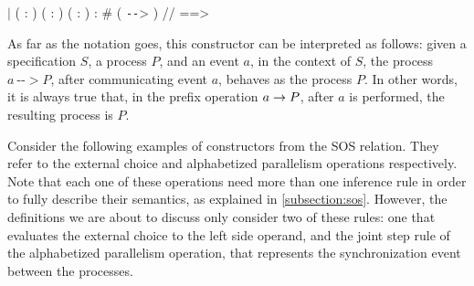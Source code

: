 \begin{coqdoccode}
	\coqdocnoindent
	\ensuremath{|}  ( : ) ( : ) ( : ) :\coqdoceol
	\coqdocindent{1.00em}
	 \# ( \texttt{-{}-}> ) //   ==> \coqdoceol
\end{coqdoccode}

As far as the notation goes, this constructor can be interpreted as follows: given a specification $ S $, a process $ P $, and an event $ a $, in the context of $ S $, the process $ a \ \texttt{-{}-}> P $, after communicating event $ a $, behaves as the process $ P $. In other words, it is always true that, in the prefix operation $ a \mathrel{\rightarrow} P $, after $ a $ is performed, the resulting process is $ P $.

Consider the following examples of constructors from the SOS relation. They refer to the external choice and alphabetized parallelism operations respectively. Note that each one of these operations need more than one inference rule in order to fully describe their semantics, as explained in \autoref{subsection:sos}. However, the definitions we are about to discuss only consider two of these rules: one that evaluates the external choice to the left side operand, and the joint step rule of the alphabetized parallelism operation, that represents the synchronization event between the processes.


